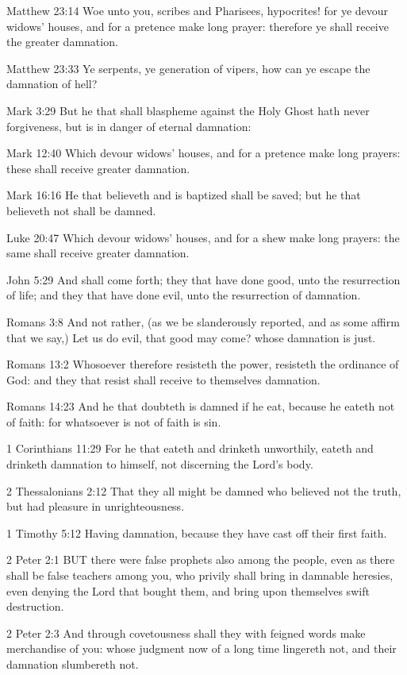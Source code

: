 			\begin{compactdesc}
				\item[Matthew 23:14] Woe unto you, scribes and Pharisees, hypocrites!  for ye devour widows' houses, and for a pretence make long prayer: therefore ye shall receive the greater damnation.
				\item[Matthew 23:33] Ye serpents, ye generation of vipers, how can ye escape the damnation of hell?
				\item[Mark 3:29] But he that shall blaspheme against the Holy Ghost hath never forgiveness, but is in danger of eternal damnation:
				\item[Mark 12:40] Which devour widows' houses, and for a pretence make long prayers: these shall receive greater damnation.
				\item[Mark 16:16] He that believeth and is baptized shall be saved; but he that believeth not shall be damned.
				\item[Luke 20:47] Which devour widows' houses, and for a shew make long prayers: the same shall receive greater damnation.
				\item[John 5:29] And shall come forth; they that have done good, unto the resurrection of life; and they that have done evil, unto the resurrection of damnation.
				\item[Romans 3:8] And not rather, (as we be slanderously reported, and as some affirm that we say,) Let us do evil, that good may come?  whose damnation is just.
				\item[Romans 13:2] Whosoever therefore resisteth the power, resisteth the ordinance of God: and they that resist shall receive to themselves damnation.
				\item[Romans 14:23] And he that doubteth is damned if he eat, because he eateth not of faith: for whatsoever is not of faith is sin.
				\item[1 Corinthians 11:29] For he that eateth and drinketh unworthily, eateth and drinketh damnation to himself, not discerning the Lord's body.
				\item[2 Thessalonians 2:12] That they all might be damned who believed not the truth, but had pleasure in unrighteousness.
				\item[1 Timothy 5:12] Having damnation, because they have cast off their first faith.
				\item[2 Peter 2:1] BUT there were false prophets also among the people, even as there shall be false teachers among you, who privily shall bring in damnable heresies, even denying the Lord that bought them, and bring upon themselves swift destruction.
				\item[2 Peter 2:3] And through covetousness shall they with feigned words make merchandise of you: whose judgment now of a long time lingereth not, and their damnation slumbereth not.
			\end{compactdesc}
			
